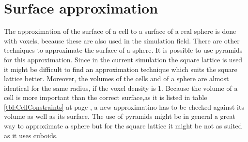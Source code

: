 \section{Surface approximation}
The approximation of the surface of a cell to a surface of a real sphere is done with voxels, because these are also used in the simulation field. There are other techniques to approximate the surface of a sphere. It is possible to use pyramids for this approximation. Since in the current simulation the square lattice is used it might be difficult to find an approximation technique which suits the square lattice better. Moreover, the volumes of the cells and of a sphere are almost identical for the same radius, if the voxel density is 1. Because the volume of a cell is more important than the correct surface,as it is listed in table \ref{tbl:CellConstraints} at page \pageref{tbl:CellConstraints}, a new approximatino has to be checked against its volume as well as its surface. The use of pyramids might be in general a great way to approximate a sphere but for the square lattice it might be not as suited as it uses cuboids.


